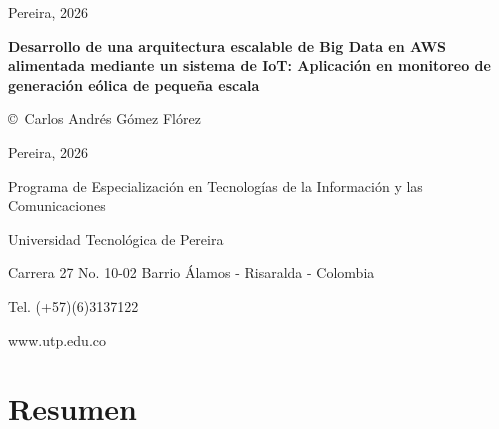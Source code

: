 \vfill

\begin{center}
Pereira, 2026
\end{center}


\cleardoublepage
\thispagestyle{empty}

\vspace*{4.2cm}

\noindent
\textbf{Desarrollo de una arquitectura escalable de Big Data en AWS alimentada mediante un sistema de IoT: Aplicación en monitoreo de generación eólica de pequeña escala}

\vspace{0.6cm}

\noindent
\copyright\ Carlos Andrés Gómez Flórez

\vspace{0.6cm}

\noindent
Pereira, 2026

\vspace{0.6cm}

\noindent
Programa de Especialización en Tecnologías de la Información y las Comunicaciones

\vspace{0.35cm}

\noindent
Universidad Tecnológica de Pereira

\vspace{0.35cm}

\noindent
Carrera 27 No. 10-02 Barrio Álamos - Risaralda - Colombia

\vspace{0.35cm}

\noindent
Tel. (+57)(6)3137122

\vspace{0.35cm}

\noindent
www.utp.edu.co


\cleardoublepage
\chapter*{Resumen}

